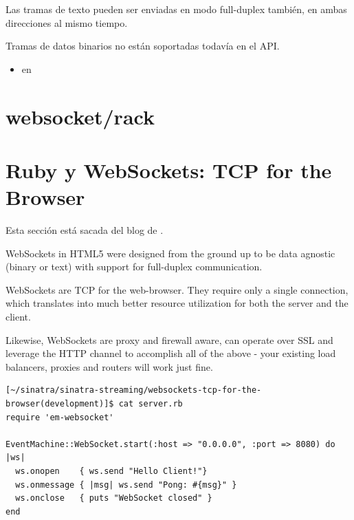 Las tramas de texto pueden ser enviadas en modo full-duplex
también, en ambas direcciones al mismo tiempo. 


Tramas de datos binarios no están soportadas todavía en el API. 
  
\begin{itemize}
\item
{}
en 
\end{itemize}

\section{websocket/rack}

\section{Ruby y WebSockets: TCP for the Browser}

Esta sección está sacada del blog de 
.

WebSockets in HTML5 were designed from
the ground up to be data agnostic (binary or text) with support for
full-duplex communication. 

WebSockets are TCP for the web-browser.
They require only a single connection,
which translates into much better resource utilization for both the
server and the client. 

Likewise, WebSockets are proxy and firewall
aware, can operate over SSL and leverage the HTTP channel to
accomplish all of the above - your existing load balancers, proxies
and routers will work just fine.


\begin{verbatim}
[~/sinatra/sinatra-streaming/websockets-tcp-for-the-browser(development)]$ cat server.rb
require 'em-websocket'

EventMachine::WebSocket.start(:host => "0.0.0.0", :port => 8080) do |ws|
  ws.onopen    { ws.send "Hello Client!"}
  ws.onmessage { |msg| ws.send "Pong: #{msg}" }
  ws.onclose   { puts "WebSocket closed" }
end
\end{verbatim}



